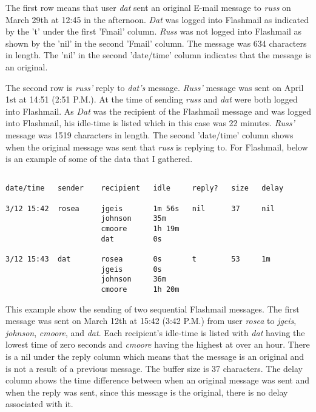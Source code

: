 The first row means that user \textit{dat} sent an original E-mail message
to \textit{russ} on March 29th at 12:45 in the afternoon.  \textit{Dat} was
logged into Flashmail as indicated by the 't' under the first 'Fmail'
column.  \textit{Russ} was not logged into Flashmail as shown by the 'nil'
in the second 'Fmail' column.  The message was 634 characters in length.
The 'nil' in the second 'date/time' column indicates that the message is an
original. 

The second row is \textit{russ'} reply to \textit{dat's} message.  \textit{Russ'} message was sent on
April 1st at 14:51 (2:51 P.M.).  At the time of sending \textit{russ} and \textit{dat} were
both logged into Flashmail. As \textit{Dat} was the recipient of the Flashmail message
and was logged into Flashmail, his idle-time is listed which in this case
was 22 minutes.  \textit{Russ'} message was 1519 characters in length.  The
second 'date/time'
column shows when the original message was sent that \textit{russ} is replying to.
\newpage For Flashmail, below is an example of some of the data that I
gathered.

\begin{verbatim}

date/time   sender    recipient   idle     reply?   size   delay

3/12 15:42  rosea     jgeis       1m 56s   nil      37     nil 
                      johnson     35m 
                      cmoore      1h 19m 
                      dat         0s

3/12 15:43  dat       rosea       0s       t        53     1m 
                      jgeis       0s 
                      johnson     36m
                      cmoore      1h 20m

\end{verbatim}

This example show the sending of two sequential Flashmail messages.  The
first message was sent on March 12th at 15:42 (3:42 P.M.) from user \textit{rosea}
to \textit{jgeis}, \textit{johnson}, \textit{cmoore}, and \textit{dat}.  Each recipient's idle-time is listed
with \textit{dat} having the lowest time of zero seconds and \textit{cmoore} having the
highest at over an hour.  There is a nil under the reply column which means
that the message is an original and is not a result of a previous message.
The buffer size is 37 characters.  The delay column shows the time
difference between when an original message was sent and when the reply was
sent, since this message is the original, there is no delay associated with
it.

